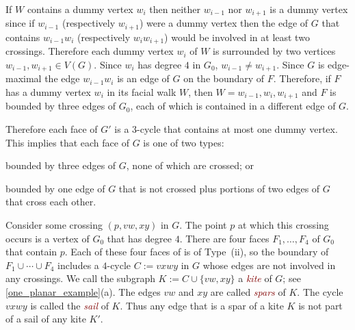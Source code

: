 \documentclass{patmorin}
\newcommand{\defin}[1]{\textcolor{Maroon}{\emph{#1}}}
\begin{document}
If $W$ contains a dummy vertex $w_i$ then neither $w_{i-1}$ nor $w_{i+1}$ is a dummy vertex since if $w_{i-1}$ (respectively $w_{i+1}$) were a dummy vertex then the edge of $G$ that contains $w_{i-1}w_i$ (respectively $w_iw_{i+1}$) would be involved in at least two crossings.  Therefore each dummy vertex $w_i$ of $W$ is surrounded by two vertices $w_{i-1},w_{i+1}\in V(G)$.  Since $w_i$ has degree $4$ in $G_0$, $w_{i-1}\neq w_{i+1}$.  Since $G$ is edge-maximal the edge $w_{i-1}w_i$ is an edge of $G$ on the boundary of $F$.  Therefore, if $F$ has a dummy vertex $w_i$ in its facial walk $W$, then $W=w_{i-1},w_i,w_{i+1}$ and $F$ is bounded by three edges of $G_0$, each of which is contained in a different edge of $G$.

Therefore each face of $G'$ is a $3$-cycle that contains at most one dummy vertex.  This implies that each face of $G$ is one of two types:
\begin{inparaenum}[(i)]
  \item bounded by three edges of $G$, none of which are crossed; or
  \item bounded by one edge of $G$ that is not crossed plus portions of two edges of $G$ that cross each other.
\end{inparaenum}

Consider some crossing $(p,vw,xy)$ in $G$.  The point $p$ at which this crossing occurs is a vertex of $G_0$ that has degree $4$.  There are four faces $F_1,\ldots,F_4$ of $G_0$ that contain $p$.  Each of these four faces of is of Type~(ii), so the boundary of $F_1\cup\cdots\cup F_4$ includes a $4$-cycle $C:=vxwy$ in $G$ whose edges are not involved in any crossings.  We call the subgraph $K:=C\cup\{vw,xy\}$ a \defin{kite} of $G$; see \cref{one_planar_example}(a).  The edges $vw$ and $xy$ are called \defin{spars} of $K$.  The cycle $vxwy$ is called the \defin{sail} of $K$.  Thus any edge that is a spar of a kite $K$ is not part of a sail of any kite $K'$.


%
\end{document}
